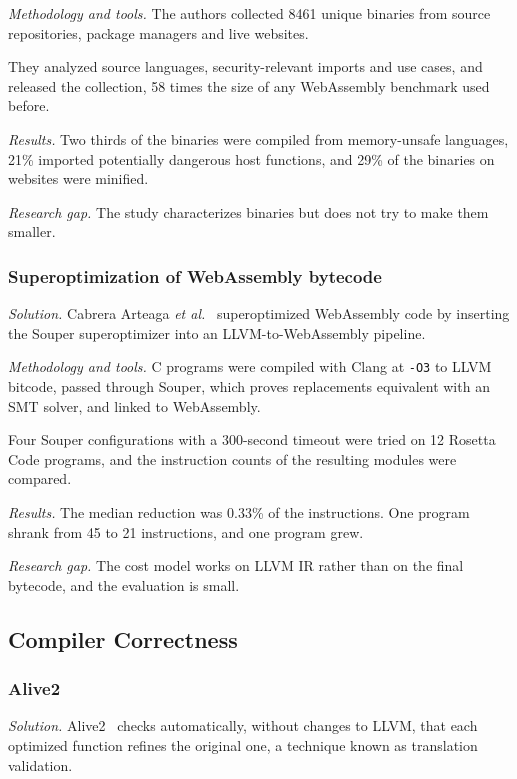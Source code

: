 \documentclass{ieeeaccess}
\begin{document}
\textit{Methodology and tools.} The authors collected 8461 unique binaries from source repositories, package managers and live websites.

They analyzed source languages, security-relevant imports and use cases, and released the collection, 58 times the size of any WebAssembly benchmark used before.

\textit{Results.} Two thirds of the binaries were compiled from memory-unsafe languages, 21\% imported potentially dangerous host functions, and 29\% of the binaries on websites were minified.

\textit{Research gap.} The study characterizes binaries but does not try to make them smaller.

\subsubsection{Superoptimization of WebAssembly bytecode}
\textit{Solution.} Cabrera Arteaga \textit{et al.}~\cite{cabrera2020superopt} superoptimized WebAssembly code by inserting the Souper superoptimizer into an LLVM-to-WebAssembly pipeline.

\textit{Methodology and tools.} C programs were compiled with Clang at \texttt{-O3} to LLVM bitcode, passed through Souper, which proves replacements equivalent with an SMT solver, and linked to WebAssembly.

Four Souper configurations with a 300-second timeout were tried on 12 Rosetta Code programs, and the instruction counts of the resulting modules were compared.

\textit{Results.} The median reduction was 0.33\% of the instructions. One program shrank from 45 to 21 instructions, and one program grew.

\textit{Research gap.} The cost model works on LLVM IR rather than on the final bytecode, and the evaluation is small.

\subsection{Compiler Correctness}

\subsubsection{Alive2}
\textit{Solution.} Alive2~\cite{lopes2021alive2} checks automatically, without changes to LLVM, that each optimized function refines the original one, a technique known as translation validation.
\end{document}
